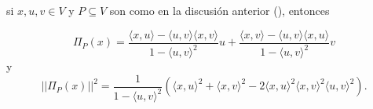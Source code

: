 	\begin{prop}
	\label{prop: formulas 20Marzo}
	si $x, u, v \in V$ y $P \subseteq V$ son como en la discusión anterior
	(),
	entonces 

		\begin{equation}
		\label{eq3: 19Marzo}
		\Pi_{P}(x)= \frac{\langle x, u \rangle -\langle u, v \rangle \langle x, v \rangle }{1-\langle u, v \rangle^{2}} u + \frac{\langle x, v \rangle -\langle u, v \rangle \langle x, u \rangle }{1-\langle u, v \rangle^{2}} v
		\end{equation}
	y 
		\begin{equation}
		\label{eq3: 19Marzo}
		  || \Pi_{P}(x) ||^{2}=
		  \frac{1}{1- \langle u, v \rangle^{2}} \left(  
	       \langle x, u \rangle^{2} +  \langle x, v \rangle^{2}	
	       -2  \langle x, u \rangle^{2} \langle x, v \rangle^{2} \langle u, v \rangle^{2}	  
		  \right).
		\end{equation}
 
	\end{prop}

